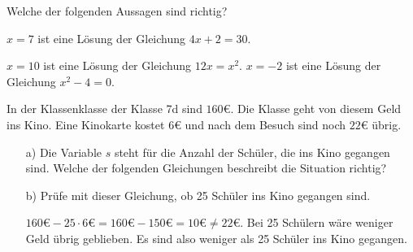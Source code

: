 \documentclass{uebungsblatt}
\begin{document}
\begin{exercise}
    Welche der folgenden Aussagen sind richtig?
    \begin{multiplechoice}
        \citem $x=7$ ist eine Lösung der Gleichung $4x+2=30$.
        \item $x=10$ ist eine Lösung der Gleichung $12x=x^2$.
        \citem $x=-2$ ist eine Lösung der Gleichung $x^2-4=0$.
    \end{multiplechoice}
\end{exercise}

\begin{exercise}
    In der Klassenklasse der Klasse 7d sind $160\euro$. Die Klasse geht von diesem Geld ins Kino. 
    Eine Kinokarte kostet $6\euro$ und nach dem Besuch sind noch $22\euro$ übrig.
    \begin{enumerate}
        \item[a)] Die Variable $s$ steht für die Anzahl der Schüler, die ins Kino gegangen sind. Welche der folgenden Gleichungen beschreibt die Situation richtig?
        \begin{multicols}{3}
        \end{multicols} 
        \item[b)] Prüfe mit dieser Gleichung, ob 25 Schüler ins Kino gegangen sind.
        \begin{answerbox}[.5in]
            $160\euro-25\cdot 6\euro=160\euro-150\euro=10\euro\neq 22\euro$. Bei 25 Schülern wäre weniger Geld übrig geblieben. Es sind also weniger als 25 Schüler ins Kino gegangen.
        \end{answerbox}
    \end{enumerate}
\end{exercise}

\end{document}
